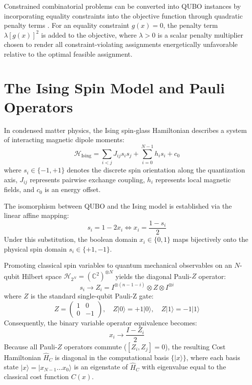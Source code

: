 Constrained combinatorial problems can be converted into QUBO instances by incorporating equality constraints into the objective function through quadratic penalty terms \cite{lucas2014ising}. For an equality constraint $g(x) = 0$, the penalty term $\lambda [g(x)]^2$ is added to the objective, where $\lambda > 0$ is a scalar penalty multiplier chosen to render all constraint-violating assignments energetically unfavorable relative to the optimal feasible assignment.

\section{The Ising Spin Model and Pauli Operators}
In condensed matter physics, the Ising spin-glass Hamiltonian describes a system of interacting magnetic dipole moments:
\begin{equation}
\mathcal{H}_{\text{Ising}} = \sum_{i < j} J_{ij} s_i s_j + \sum_{i=0}^{N-1} h_i s_i + c_0
\end{equation}
where $s_i \in \{-1, +1\}$ denotes the discrete spin orientation along the quantization axis, $J_{ij}$ represents pairwise exchange coupling, $h_i$ represents local magnetic fields, and $c_0$ is an energy offset.

The isomorphism between QUBO and the Ising model is established via the linear affine mapping:
\begin{equation}
\label{eq:affine_spin}
s_i = 1 - 2x_i \iff x_i = \frac{1 - s_i}{2}
\end{equation}
Under this substitution, the boolean domain $x_i \in \{0, 1\}$ maps bijectively onto the physical spin domain $s_i \in \{+1, -1\}$.

Promoting classical spin variables to quantum mechanical observables on an $N$-qubit Hilbert space $\mathcal{H}_{2^N} = (\mathbb{C}^2)^{\otimes N}$ yields the diagonal Pauli-$Z$ operator:
\begin{equation}
s_i \longrightarrow Z_i = I^{\otimes (n-1-i)} \otimes Z \otimes I^{\otimes i}
\end{equation}
where $Z$ is the standard single-qubit Pauli-Z gate:
\begin{equation}
Z = \begin{pmatrix} 1 & 0 \\ 0 & -1 \end{pmatrix}, \quad Z |0\rangle = +1 |0\rangle, \quad Z |1\rangle = -1 |1\rangle
\end{equation}
Consequently, the binary variable operator equivalence becomes:
\begin{equation}
\label{eq:operator_equiv}
x_i \longrightarrow \frac{I - Z_i}{2}
\end{equation}
Because all Pauli-$Z$ operators commute ($[Z_i, Z_j] = 0$), the resulting Cost Hamiltonian $\hat{H}_C$ is diagonal in the computational basis $\{|x\rangle\}$, where each basis state $|x\rangle = |x_{N-1} \dots x_0\rangle$ is an eigenstate of $\hat{H}_C$ with eigenvalue equal to the classical cost function $C(x)$.

